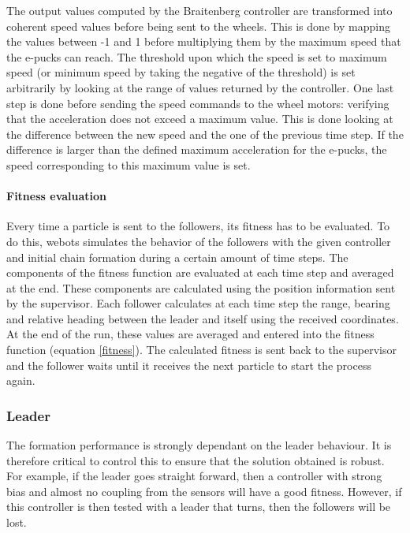 \documentclass[a4paper, 10pt, conference]{ieeeconf}      %
\begin{document}
The output values computed by the Braitenberg controller are transformed into coherent speed values before being sent to the wheels. This is done by mapping the values between -1 and 1 before multiplying them by the maximum speed that the e-pucks can reach. The threshold upon which the speed is set to maximum speed (or minimum speed by taking the negative of the threshold) is set arbitrarily by looking at the range of values returned by the controller.
One last step is done before sending the speed commands to the wheel motors: verifying that the acceleration does not exceed a maximum value. This is done looking at the difference between the new speed and the one of the previous time step. If the difference is larger than the defined maximum acceleration for the e-pucks, the speed corresponding to this maximum value is set.

\paragraph{Fitness evaluation}
Every time a particle is sent to the followers, its fitness has to be evaluated. To do this, webots simulates the behavior of the followers with the given controller and initial chain formation during a certain amount of time steps. The components of the fitness function are evaluated at each time step and averaged at the end. These components are calculated using the position information sent by the supervisor. Each follower calculates at each time step the range, bearing and relative heading between the leader and itself using the received coordinates. At the end of the run, these values are averaged and entered into the fitness function (equation \ref{fitness}). The calculated fitness is sent back to the supervisor and the follower waits until it receives the next particle to start the process again.

\subsubsection{Leader}
The formation performance is strongly dependant on the leader behaviour. It is therefore critical to control this to ensure that the solution obtained is robust. For example, if the leader goes straight forward, then a controller with strong bias and almost no coupling from the sensors will have a good fitness. However, if this controller is then tested with a leader that turns, then the followers will be lost. 
\end{document}
